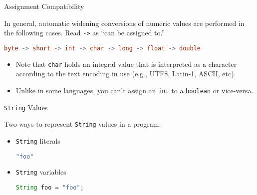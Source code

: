 \documentclass{beamer}
\begin{document}
\begin{frame}[fragile]{Assignment Compatibility}


In general, automatic widening conversions of numeric values are performed in the following cases.  Read {\tt ->} as ``can be assigned to.''

\begin{lstlisting}[language=Java]
byte -> short -> int -> char -> long -> float -> double
\end{lstlisting}

\begin{itemize}
\item Note that {\tt char} holds an integral value that is interpreted as a character according to the text encoding in use (e.g., UTF8, Latin-1, ASCII, etc).
\item Unlike in some languages, you can't assign an {\tt int} to a {\tt boolean} or vice-versa.
\end{itemize}

\end{frame}



\begin{frame}[fragile]{{\tt String} Values}


Two ways to represent {\tt String} values in a program:
\begin{itemize}

\item {\tt String} literals
\begin{lstlisting}[language=Java]
"foo"
\end{lstlisting}

\item {\tt String} variables

\begin{lstlisting}[language=Java]
String foo = "foo";
\end{lstlisting}

 
\end{itemize}
\end{frame}
\end{document}

